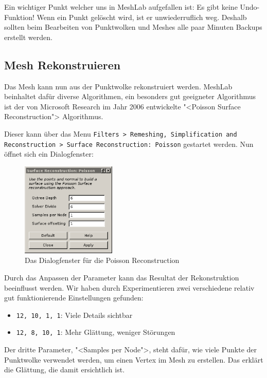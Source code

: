 Ein wichtiger Punkt welcher uns in MeshLab aufgefallen ist: Es gibt keine
Undo-Funktion! Wenn ein Punkt gelöscht wird, ist er unwiederruflich weg.
Deshalb sollten beim Bearbeiten von Punktwolken und Meshes alle paar Minuten
Backups erstellt werden.

\subsection{Mesh Rekonstruieren}

Das Mesh kann nun aus der Punktwolke rekonstruiert werden. MeshLab beinhaltet
dafür diverse Algorithmen, ein besonders gut geeigneter Algorithmus ist der von
Microsoft Research im Jahr 2006 entwickelte "<Poisson Surface
Reconstruction">\cite{kazhdan:2006} Algorithmus.

Dieser kann über das Menu \texttt{Filters > Remeshing, Simplification and
Reconstruction > Surface Reconstruction: Poisson} gestartet werden. Nun öffnet
sich ein Dialogfenster:

\begin{figure}[H]
	\centering
	\includegraphics[width=0.4\textwidth]{images/poisson_dialog.png}
	\caption{Das Dialogfenster für die Poisson Reconstruction}
	\label{img:meshlab_poisson_dialog}
\end{figure}

Durch das Anpassen der Parameter kann das Resultat der Rekonstruktion
beeinflusst werden. Wir haben durch Experimentieren zwei verschiedene
relativ gut funktionierende Einstellungen gefunden:

\begin{itemize}
	\setlength\itemsep{0.3em}
	\item \texttt{12, 10, 1, 1}: Viele Details sichtbar
	\item \texttt{12, 8, 10, 1}: Mehr Glättung, weniger Störungen
\end{itemize}

\noindent Der dritte Parameter, "<Samples per Node">, steht dafür, wie viele
Punkte der Punktwolke verwendet werden, um einen Vertex im Mesh zu erstellen.
Das erklärt die Glättung, die damit ersichtlich ist.


